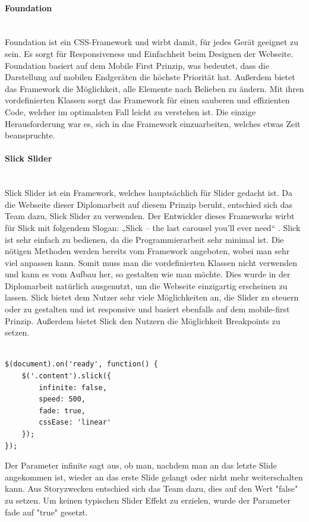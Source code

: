 \paragraph{Foundation} \leavevmode \\
Foundation ist ein CSS-Framework und wirbt damit, für jedes Gerät geeignet zu sein. Es sorgt für Responsiveness und Einfachheit beim Designen der Webseite. Foundation basiert auf dem Mobile First Prinzip, was bedeutet, dass die Darstellung auf mobilen Endgeräten die höchste Priorität hat. \cite{mobilefirst} Außerdem bietet das Framework die Möglichkeit, alle Elemente nach Belieben zu ändern. Mit ihren vordefinierten Klassen sorgt das Framework für einen sauberen und effizienten Code, welcher im optimalsten Fall leicht zu verstehen ist. Die einzige Herausforderung war es, sich in das Framework einzuarbeiten, welches etwas Zeit beanspruchte. \cite{foundationwebsite}
\paragraph{Slick Slider} \leavevmode \\
Slick Slider ist ein Framework, welches hauptsächlich für Slider gedacht ist. Da die Webseite dieser Diplomarbeit auf diesem Prinzip beruht, entschied sich das Team dazu, Slick Slider zu verwenden. Der Entwickler dieses Frameworks wirbt für Slick mit folgendem Slogan: „Slick – the last carousel you’ll ever need“ \cite{slick}. Slick ist sehr einfach zu bedienen, da die Programmierarbeit sehr minimal ist. Die nötigen Methoden werden bereits vom Framework angeboten, wobei man sehr viel anpassen kann. Somit muss man die vordefinierten Klassen nicht verwenden und kann es vom Aufbau her, so gestalten wie man möchte. Dies wurde in der Diplomarbeit natürlich ausgenutzt, um die Webseite einzigartig erscheinen zu lassen. Slick bietet dem Nutzer sehr viele Möglichkeiten an, die Slider zu steuern oder zu gestalten und ist responsive und basiert ebenfalls auf dem mobile-first Prinzip. Außerdem bietet Slick den Nutzern die Möglichkeit Breakpoints zu setzen.

\lstset{
  frame=leftline,
  xleftmargin=.05\textwidth
}
\begin{lstlisting}

$(document).on('ready', function() {
	$('.content').slick({
		infinite: false,
		speed: 500,
		fade: true,
		cssEase: 'linear'
	});
});
\end{lstlisting} \leavevmode \newline
Der Parameter infinite sagt aus, ob man, nachdem man an das letzte Slide angekommen ist, wieder an das erste Slide gelangt oder nicht mehr weiterschalten kann. Aus Storyzwecken entschied sich das Team dazu, dies auf den Wert "false" zu setzen. Um keinen typischen Slider Effekt zu erzielen, wurde der Parameter fade auf "true" gesetzt.

